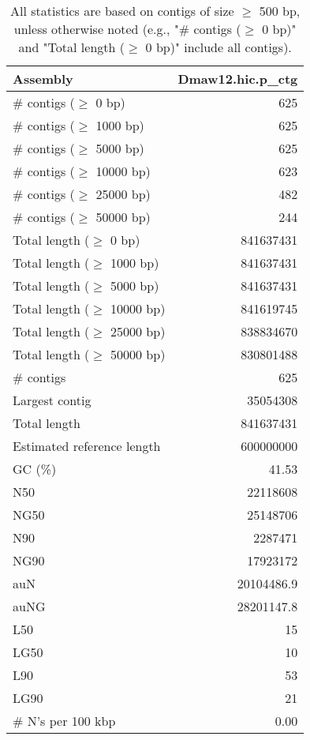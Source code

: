 \documentclass[12pt,a4paper]{article}
\begin{document}
\begin{table}[ht]
\begin{center}
\caption{All statistics are based on contigs of size $\geq$ 500 bp, unless otherwise noted (e.g., "\# contigs ($\geq$ 0 bp)" and "Total length ($\geq$ 0 bp)" include all contigs).}
\begin{tabular}{|l*{1}{|r}|}
\hline
Assembly & Dmaw12.hic.p\_ctg \\ \hline
\# contigs ($\geq$ 0 bp) & 625 \\ \hline
\# contigs ($\geq$ 1000 bp) & 625 \\ \hline
\# contigs ($\geq$ 5000 bp) & 625 \\ \hline
\# contigs ($\geq$ 10000 bp) & 623 \\ \hline
\# contigs ($\geq$ 25000 bp) & 482 \\ \hline
\# contigs ($\geq$ 50000 bp) & 244 \\ \hline
Total length ($\geq$ 0 bp) & 841637431 \\ \hline
Total length ($\geq$ 1000 bp) & 841637431 \\ \hline
Total length ($\geq$ 5000 bp) & 841637431 \\ \hline
Total length ($\geq$ 10000 bp) & 841619745 \\ \hline
Total length ($\geq$ 25000 bp) & 838834670 \\ \hline
Total length ($\geq$ 50000 bp) & 830801488 \\ \hline
\# contigs & 625 \\ \hline
Largest contig & 35054308 \\ \hline
Total length & 841637431 \\ \hline
Estimated reference length & 600000000 \\ \hline
GC (\%) & 41.53 \\ \hline
N50 & 22118608 \\ \hline
NG50 & 25148706 \\ \hline
N90 & 2287471 \\ \hline
NG90 & 17923172 \\ \hline
auN & 20104486.9 \\ \hline
auNG & 28201147.8 \\ \hline
L50 & 15 \\ \hline
LG50 & 10 \\ \hline
L90 & 53 \\ \hline
LG90 & 21 \\ \hline
\# N's per 100 kbp & 0.00 \\ \hline
\end{tabular}
\end{center}
\end{table}
\end{document}
